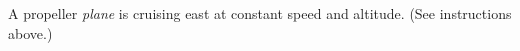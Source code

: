 A propeller \emph{plane} is cruising east at constant
speed and altitude.
(See instructions above.)
